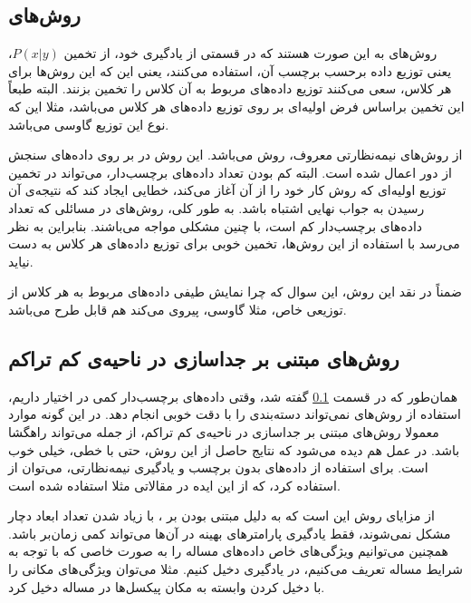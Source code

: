 \documentclass[11pt]{article}
\begin{document}
\subsection{روش‌های \generative{}}\label{subsec:generative}
روش‌های \generative{} به این صورت هستند که در قسمتی از یادگیری خود، از تخمین $P(x\vert y)$، یعنی توزیع داده برحسب برچسب آن، استفاده می‌کنند، یعنی این که این روش‌ها برای هر کلاس، سعی می‌کنند توزیع داده‌های مربوط به آن کلاس را تخمین بزنند. البته طبعاً این تخمین براساس فرض اولیه‌ای بر روی توزیع داده‌های هر کلاس می‌باشد، مثلا این که نوع این توزیع گاوسی می‌باشد.

از روش‌های \generative{} نیمه‌نظارتی معروف، روش \EM{} می‌باشد. این روش در \cite{EM_RS_1} بر روی داده‌های سنجش از دور اعمال شده است. البته کم بودن تعداد داده‌های برچسب‌دار، می‌تواند در تخمین توزیع اولیه‌ای که روش \EM{} کار خود را از آن آغاز می‌کند، خطایی ایجاد کند که نتیجه‌ی آن رسیدن به جواب نهایی اشتباه باشد. به طور کلی، روش‌های \generative{} در مسائلی که تعداد داده‌های برچسب‌دار کم است، با چنین مشکلی مواجه می‌باشند. بنابراین به نظر می‌رسد با استفاده از این روش‌ها، تخمین خوبی برای توزیع داده‌های هر کلاس به دست نیاید.

ضمناً در نقد این روش، این سوال که چرا نمایش طیفی داده‌های مربوط به هر کلاس از توزیعی خاص، مثلا گاوسی، پیروی می‌کند هم قابل طرح می‌باشد.

\subsection{روش‌های مبتنی بر جداسازی در ناحیه‌ی کم تراکم}\label{subsec:lowdensity}

همان‌طور که در قسمت \ref{subsec:generative} گفته شد، وقتی داده‌های برچسب‌دار کمی در اختیار داریم، استفاده از روش‌های \generative{} نمی‌تواند دسته‌بندی را با دقت خوبی انجام دهد. در این گونه موارد معمولا روش‌های مبتنی بر جداسازی در ناحیه‌ی کم تراکم، از جمله \SVM{} می‌تواند راهگشا باشد. در عمل هم دیده می‌شود که نتایج حاصل از این روش، حتی با  خطی، خیلی خوب است. برای استفاده از داده‌های بدون برچسب و یادگیری نیمه‌نظارتی، می‌توان از \transductiveSVM{} استفاده کرد، که از این ایده در مقالاتی مثلا \cite{transductiveSVM_1} استفاده شده است.

از مزایای روش \SVM{}  این است که به دلیل مبتنی بودن بر ، با زیاد شدن تعداد ابعاد دچار مشکل نمی‌شوند، فقط یادگیری پارامترهای  بهینه در آن‌ها می‌تواند کمی زمان‌بر باشد. همچنین می‌توانیم ویژگی‌های خاص داده‌های مساله را به صورت  خاصی که با توجه به شرایط مساله تعریف می‌کنیم، در یادگیری دخیل کنیم. مثلا می‌توان ویژگی‌های مکانی را با دخیل کردن   وابسته به مکان پیکسل‌ها در مساله دخیل کرد.
\end{document}
